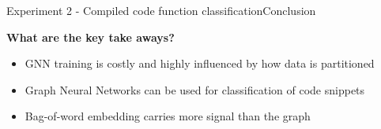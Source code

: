 \documentclass[xcolor=table]{beamer}
\begin{document}
\begin{frame}{Experiment 2 - Compiled code function classification}{Conclusion}



\textbf{What are the key take aways?}
\begin{itemize}
    \item GNN training is costly and highly influenced by how data is partitioned
    \item Graph Neural Networks can be used for classification of code snippets
    \item Bag-of-word embedding carries more signal than the graph

\end{itemize}

\end{frame}
\end{document}
